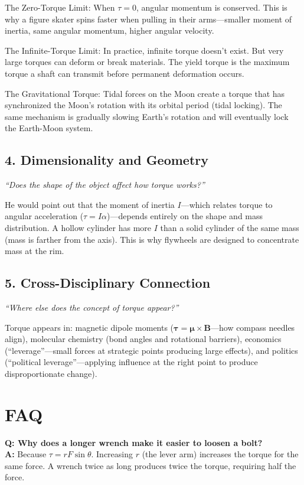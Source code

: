 \documentclass[11pt,openright]{book}
\begin{document}
The Zero-Torque Limit: When $\tau = 0$, angular momentum is conserved. This is why a figure skater spins faster when pulling in their arms---smaller moment of inertia, same angular momentum, higher angular velocity.

The Infinite-Torque Limit: In practice, infinite torque doesn't exist. But very large torques can deform or break materials. The yield torque is the maximum torque a shaft can transmit before permanent deformation occurs.

The Gravitational Torque: Tidal forces on the Moon create a torque that has synchronized the Moon's rotation with its orbital period (tidal locking). The same mechanism is gradually slowing Earth's rotation and will eventually lock the Earth-Moon system.

\subsection*{4. Dimensionality and Geometry}
\textit{``Does the shape of the object affect how torque works?''}

He would point out that the moment of inertia $I$---which relates torque to angular acceleration ($\tau = I\alpha$)---depends entirely on the shape and mass distribution. A hollow cylinder has more $I$ than a solid cylinder of the same mass (mass is farther from the axis). This is why flywheels are designed to concentrate mass at the rim.

\subsection*{5. Cross-Disciplinary Connection}
\textit{``Where else does the concept of torque appear?''}

Torque appears in: magnetic dipole moments ($\boldsymbol{\tau} = \boldsymbol{\mu} \times \mathbf{B}$---how compass needles align), molecular chemistry (bond angles and rotational barriers), economics (``leverage''---small forces at strategic points producing large effects), and politics (``political leverage''---applying influence at the right point to produce disproportionate change).
\section*{FAQ}

\textbf{Q: Why does a longer wrench make it easier to loosen a bolt?}\\
\textbf{A:} Because $\tau = rF\sin\theta$. Increasing $r$ (the lever arm) increases the torque for the same force. A wrench twice as long produces twice the torque, requiring half the force.
\end{document}
